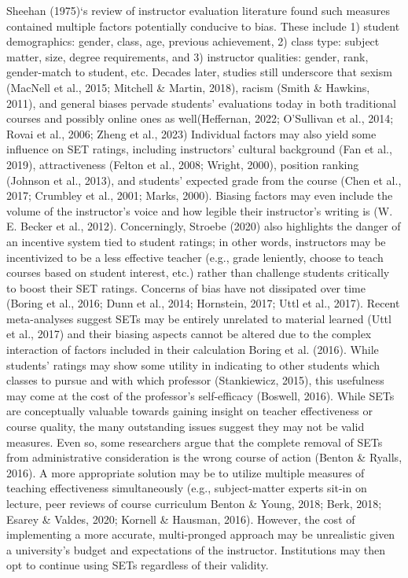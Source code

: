 \documentclass[
  man]{apa7}
\begin{document}
Sheehan (1975)`s review of instructor evaluation literature found such
measures contained multiple factors potentially conducive to bias. These
include 1) student demographics: gender, class, age, previous
achievement, 2) class type: subject matter, size, degree requirements,
and 3) instructor qualities: gender, rank, gender-match to student, etc.
Decades later, studies still underscore that sexism (MacNell et al., 2015; Mitchell \& Martin, 2018), racism (Smith \& Hawkins, 2011), and general biases pervade
students' evaluations today in both traditional courses and possibly
online ones as well(Heffernan, 2022; O'Sullivan et al., 2014; Rovai et al., 2006; Zheng et al., 2023) Individual factors may also yield some influence on SET
ratings, including instructors' cultural background (Fan et al., 2019),
attractiveness (Felton et al., 2008; Wright, 2000), position ranking
(Johnson et al., 2013), and students' expected grade from the course (Chen et al., 2017; Crumbley et al., 2001; Marks, 2000). Biasing factors may even include the volume
of the instructor's voice and how legible their instructor's writing is
(W. E. Becker et al., 2012). Concerningly, Stroebe (2020) also highlights the danger of
an incentive system tied to student ratings; in other words, instructors
may be incentivized to be a less effective teacher (e.g., grade
leniently, choose to teach courses based on student interest, etc.)
rather than challenge students critically to boost their SET ratings.
Concerns of bias have not dissipated over time (Boring et al., 2016; Dunn et al., 2014; Hornstein, 2017; Uttl et al., 2017). Recent meta-analyses suggest SETs may be
entirely unrelated to material learned (Uttl et al., 2017) and their biasing
aspects cannot be altered due to the complex interaction of factors
included in their calculation Boring et al. (2016). While students' ratings may
show some utility in indicating to other students which classes to
pursue and with which professor (Stankiewicz, 2015), this usefulness may come at
the cost of the professor's self-efficacy (Boswell, 2016). While SETs are
conceptually valuable towards gaining insight on teacher effectiveness
or course quality, the many outstanding issues suggest they may not be
valid measures. Even so, some researchers argue that the complete
removal of SETs from administrative consideration is the wrong course of
action (Benton \& Ryalls, 2016). A more appropriate solution may be to utilize
multiple measures of teaching effectiveness simultaneously (e.g.,
subject-matter experts sit-in on lecture, peer reviews of course
curriculum Benton \& Young, 2018; Berk, 2018; Esarey \& Valdes, 2020; Kornell \& Hausman, 2016). However,
the cost of implementing a more accurate, multi-pronged approach may be
unrealistic given a university's budget and expectations of the
instructor. Institutions may then opt to continue using SETs regardless
of their validity.
\end{document}
